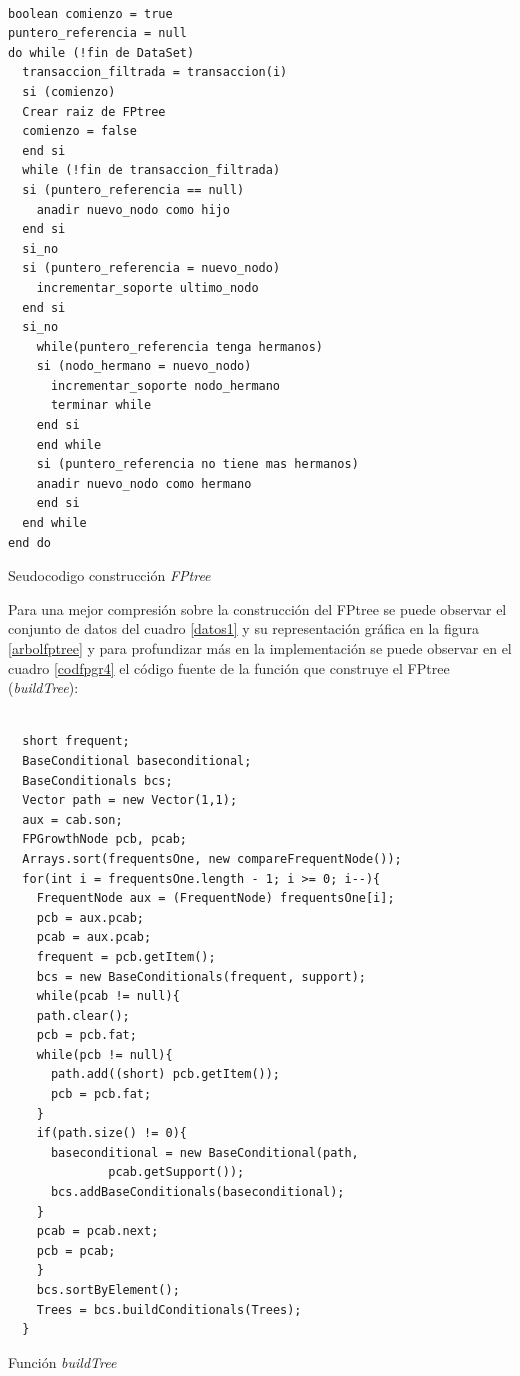\begin{codigof}[!h]
\begin{verbatim}

boolean comienzo = true
puntero_referencia = null
do while (!fin de DataSet)
  transaccion_filtrada = transaccion(i)
  si (comienzo)
  Crear raiz de FPtree
  comienzo = false
  end si
  while (!fin de transaccion_filtrada)
  si (puntero_referencia == null)
    anadir nuevo_nodo como hijo
  end si
  si_no
  si (puntero_referencia = nuevo_nodo)
    incrementar_soporte ultimo_nodo
  end si
  si_no
    while(puntero_referencia tenga hermanos)
    si (nodo_hermano = nuevo_nodo)
      incrementar_soporte nodo_hermano
      terminar while
    end si
    end while
    si (puntero_referencia no tiene mas hermanos)
    anadir nuevo_nodo como hermano
    end si
  end while
end do
\end{verbatim}
\caption{Seudocodigo construcci\'on \textit{FPtree}}
\label{codfpgr3}
\end{codigof}

Para una mejor compresi\'on sobre la construcci\'on del FPtree se puede observar el conjunto de datos del cuadro
\ref{datos1} y su representaci\'on gr\'afica en la figura \ref{arbolfptree} y para profundizar m\'as en la
implementaci\'on se puede observar en el cuadro \ref{codfpgr4} el c\'odigo fuente de la funci\'on que construye el
FPtree (\textit{buildTree}):\\

\newpage
\begin{codigof}[!h]
\begin{verbatim}
  
  short frequent;
  BaseConditional baseconditional;
  BaseConditionals bcs;
  Vector path = new Vector(1,1);
  aux = cab.son;
  FPGrowthNode pcb, pcab;
  Arrays.sort(frequentsOne, new compareFrequentNode());
  for(int i = frequentsOne.length - 1; i >= 0; i--){
    FrequentNode aux = (FrequentNode) frequentsOne[i];
    pcb = aux.pcab;
    pcab = aux.pcab;
    frequent = pcb.getItem();
    bcs = new BaseConditionals(frequent, support);
    while(pcab != null){
    path.clear();
    pcb = pcb.fat;
    while(pcb != null){
      path.add((short) pcb.getItem());
      pcb = pcb.fat;
    }
    if(path.size() != 0){
      baseconditional = new BaseConditional(path, 
	          pcab.getSupport());
      bcs.addBaseConditionals(baseconditional);
    }
    pcab = pcab.next;
    pcb = pcab;
    }
    bcs.sortByElement();
    Trees = bcs.buildConditionals(Trees);
  }
\end{verbatim}
\caption{Funci\'on \textit{buildTree}}
\label{codfpgr4}
\end{codigof}

